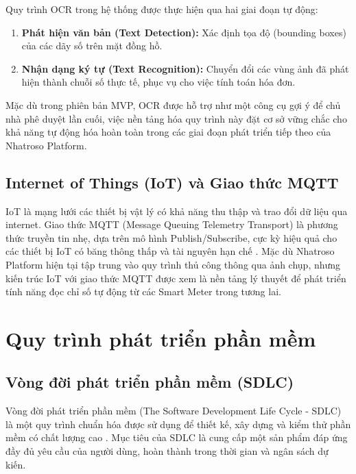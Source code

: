 Quy trình OCR trong hệ thống được thực hiện qua hai giai đoạn tự động:
\begin{enumerate}
    \item \textbf{Phát hiện văn bản (Text Detection):} Xác định tọa độ (bounding boxes) của các dãy số trên mặt đồng hồ.
    \item \textbf{Nhận dạng ký tự (Text Recognition):} Chuyển đổi các vùng ảnh đã phát hiện thành chuỗi số thực tế, phục vụ cho việc tính toán hóa đơn.
\end{enumerate}

Mặc dù trong phiên bản MVP, OCR được hỗ trợ như một công cụ gợi ý để chủ nhà phê duyệt lần cuối, việc nền tảng hóa quy trình này đặt cơ sở vững chắc cho khả năng tự động hóa hoàn toàn trong các giai đoạn phát triển tiếp theo của Nhatroso Platform.

\subsection{Internet of Things (IoT) và Giao thức MQTT}
IoT là mạng lưới các thiết bị vật lý có khả năng thu thập và trao đổi dữ liệu qua internet. Giao thức MQTT (Message Queuing Telemetry Transport) là phương thức truyền tin nhẹ, dựa trên mô hình Publish/Subscribe, cực kỳ hiệu quả cho các thiết bị IoT có băng thông thấp và tài nguyên hạn chế \cite{MQTT}.
Mặc dù Nhatroso Platform hiện tại tập trung vào quy trình thủ công thông qua ảnh chụp, nhưng kiến trúc IoT với giao thức MQTT được xem là nền tảng lý thuyết để phát triển tính năng đọc chỉ số tự động từ các Smart Meter trong tương lai.

\section{Quy trình phát triển phần mềm}

\subsection{Vòng đời phát triển phần mềm (SDLC)}
Vòng đời phát triển phần mềm (The Software Development Life Cycle - SDLC) là một quy trình chuẩn hóa được sử dụng để thiết kế, xây dựng và kiểm thử phần mềm có chất lượng cao \cite{SommervilleSE}. Mục tiêu của SDLC là cung cấp một sản phẩm đáp ứng đầy đủ yêu cầu của người dùng, hoàn thành trong thời gian và ngân sách dự kiến.

